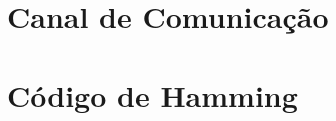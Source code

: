 \documentclass[answers]{exam}
\begin{document}
\section{Canal de Comunicação}


















\section{Código de Hamming}





%
%










%
\end{document}
